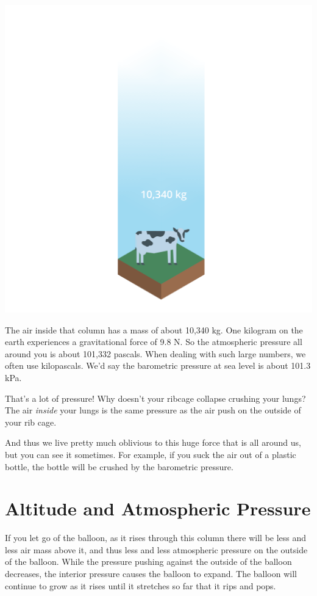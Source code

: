 \includegraphics[width=\textwidth]{aircolumn.png}

The air inside that column has a mass of about 10,340 kg.  One kilogram on the earth experiences a gravitational force of 9.8 N.   
So the atmospheric pressure all around you is about 101,332 pascals.  
When dealing with such large numbers, we often use kilopascals.  
We'd say the barometric pressure at sea level is about 101.3 kPa.

That's a lot of pressure!  Why doesn't your ribcage collapse crushing your lungs?  The air \emph{inside} your lungs is the same 
pressure as the air push on the outside of your rib cage.  

And thus we live pretty much oblivious to this huge force that is all around us, but you can see it sometimes.  
For example, if you suck the air out of a plastic bottle,   the bottle will be crushed by the barometric pressure.

\section{Altitude and Atmospheric Pressure}

If you let go of the balloon, as it rises through this column there will be less and less air mass above it, and thus less and less atmospheric pressure on the outside of the balloon. While the pressure pushing against the outside of the balloon decreases, the interior pressure causes the balloon to expand. The balloon will continue to grow as it rises until it stretches so far that it rips and pops.


